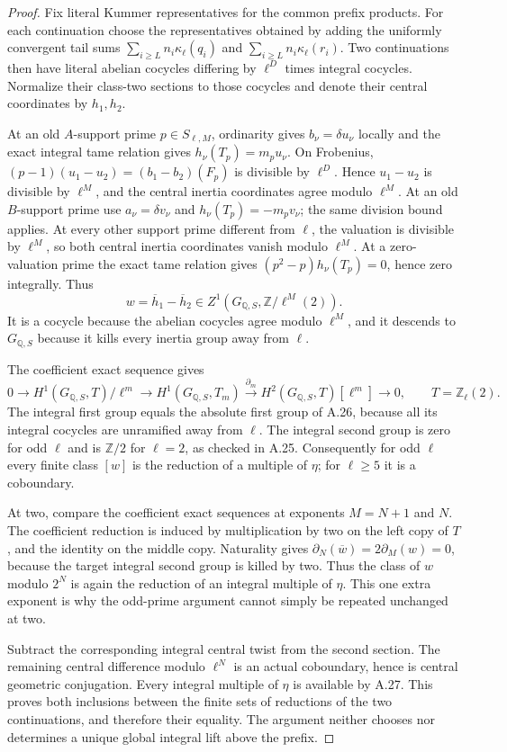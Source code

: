 \begin{proof}
Fix literal Kummer representatives for the common prefix products.
For each continuation choose the representatives obtained by adding
the uniformly convergent tail sums $\sum_{i\geq L}n_i\kappa_\ell(q_i)$
and $\sum_{i\geq L}n_i\kappa_\ell(r_i)$. Two continuations then
have literal abelian cocycles differing by $\ell^D$ times integral
cocycles. Normalize their class-two sections to those cocycles and
denote their central coordinates by $h_1,h_2$.

At an old $A$-support prime $p\in S_{\ell,M}$, ordinarity gives
$b_\nu=\delta u_\nu$ locally and the exact integral tame relation
gives $h_\nu(T_p)=m_pu_\nu$. On Frobenius,
$(p-1)(u_1-u_2)=(b_1-b_2)(F_p)$ is divisible by $\ell^D$.
Hence $u_1-u_2$ is divisible by $\ell^M$, and the central inertia
coordinates agree modulo $\ell^M$. At an old $B$-support prime use
$a_\nu=\delta v_\nu$ and $h_\nu(T_p)=-m_pv_\nu$; the same
division bound applies. At every other support prime different from
$\ell$, the valuation is divisible by $\ell^M$, so both central
inertia coordinates vanish modulo $\ell^M$. At a zero-valuation
prime the exact tame relation gives $(p^2-p)h_\nu(T_p)=0$, hence
zero integrally. Thus
\[
 w=\overline h_1-\overline h_2
       \in Z^1(G_{\mathbb Q,S},\mathbb Z/\ell^M(2)).
\]
It is a cocycle because the abelian cocycles agree modulo $\ell^M$,
and it descends to $G_{\mathbb Q,S}$ because it kills every inertia
group away from $\ell$.

The coefficient exact sequence gives
\[
 0\to H^1(G_{\mathbb Q,S},T)/\ell^m
 \to H^1(G_{\mathbb Q,S},T_m)
 \xrightarrow{\partial_m}H^2(G_{\mathbb Q,S},T)[\ell^m]\to0,
 \qquad T=\mathbb Z_\ell(2).
\]
The integral first group equals the absolute first group of A.26,
because all its integral cocycles are unramified away from $\ell$.
The integral second group is zero for odd $\ell$ and is
$\mathbb Z/2$ for $\ell=2$, as checked in A.25.
Consequently for odd $\ell$ every finite class $[w]$ is the reduction
of a multiple of $\eta$; for $\ell\geq5$ it is a coboundary.

At two, compare the coefficient exact sequences at exponents $M=N+1$
and $N$. The coefficient reduction is induced by multiplication by two
on the left copy of $T$, and the identity on the middle copy.
Naturality gives
$\partial_N(\overline w)=2\partial_M(w)=0$, because the target
integral second group is killed by two. Thus the class of $w$ modulo
$2^N$ is again the reduction of an integral multiple of $\eta$.
This one extra exponent is why the odd-prime argument cannot simply
be repeated unchanged at two.

Subtract the corresponding integral central twist from the second
section. The remaining central difference modulo $\ell^N$ is an
actual coboundary, hence is central geometric conjugation. Every
integral multiple of $\eta$ is available by A.27. This proves both
inclusions between the finite sets of reductions of the two
continuations, and therefore their equality. The argument neither
chooses nor determines a unique global integral lift above the prefix.
\end{proof}


